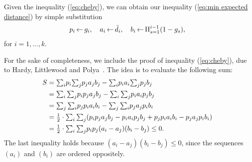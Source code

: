 \documentclass[oneside,final]{ucr}
\begin{document}
Given the inequality (\ref{eq:cheby}), we can obtain our
inequality (\ref{eq:min expected distance}) by simple
substitution
%
\begin{equation*}
  p_i {\,\leftarrow\,} g_i,\quad a_i {\,\leftarrow\,} {\bar d}_i,\quad b_i {\,\leftarrow\,}
  \Pi_{s=1}^{i-1} (1-g_s),
\end{equation*}
%
for $i = 1,...,k$.

For the sake of completeness, we include the proof of
inequality (\ref{eq:cheby}), due to Hardy, Littlewood and
Polya~\cite{HardyLP88}. The idea is to evaluate the
following sum:
%
\begin{align*}
  S &= \textstyle{\sum_i} p_i \textstyle{\sum_j} p_j a_j b_j - \textstyle{\sum_i} p_i a_i \textstyle{\sum_j} p_j b_j
	\\
  & = \textstyle{\sum_i \sum_j} p_i p_j a_j b_j - \textstyle{\sum_i \sum_j} p_i a_i p_j b_j
	\\
  & = \textstyle{\sum_j \sum_i} p_j p_i a_i b_i - \textstyle{\sum_j \sum _i} p_j a_j p_i b_i
	\\
	&= {\mbox{$\frac{1}{2}$}} \cdot \textstyle{\sum_i \sum_j} (p_i p_j a_j b_j - p_i a_i p_j b_j + p_j p_i a_i
  							b_i - p_j a_j p_i b_i)
\\
  &= {\mbox{$\frac{1}{2}$}} \cdot \textstyle{\sum_i \sum_j} p_i p_j (a_i - a_j)(b_i - b_j) \leq 0.
\end{align*}
The last inequality holds because $(a_i-a_j)(b_i-b_j) \leq
0$, since the sequences $(a_i)$ and $(b_i)$ are ordered
oppositely.
\end{document}
